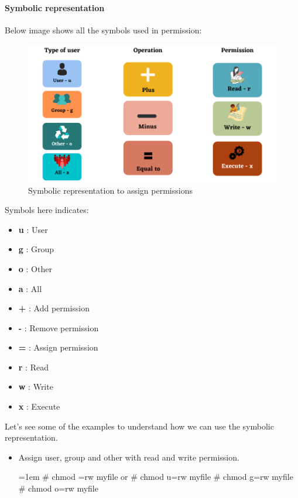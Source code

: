 \begin{flushleft}
	\paragraph{Symbolic representation}
	\bigskip
	Below image shows all the symbols used in permission:
	\begin{figure}[h!]
		\centering
		\includegraphics[scale=0.6]{content/chapter5/images/perm8.png}
		\bigskip
		\caption{Symbolic representation to assign permissions}
		\label{fig:assign_permission}
	\end{figure}
	
	Symbols here indicates:
	\begin{itemize}
		\item \textbf{u} : User
		\item \textbf{g} : Group
		\item \textbf{o} : Other
		\item \textbf{a} : All
		\item \textbf{+} : Add permission
		\item \textbf{-} : Remove permission
		\item \textbf{=} : Assign permission
		\item \textbf{r} : Read
		\item \textbf{w} : Write
		\item \textbf{x} : Execute
	\end{itemize}


	
	

	\newpage
	Let's see some of the examples to understand how we can use the symbolic representation.
	\begin{itemize}
	\item Assign user, group and other with read and write permission.
	\begin{tcolorbox}[breakable,notitle,boxrule=-0pt,colback=black,colframe=black]
		\color{green}
		\font=1em
		\# chmod =rw myfile
		\newline
		or
		\newline
		\# chmod u=rw myfile
		\newline
		\# chmod g=rw myfile
		\newline
		\# chmod o=rw myfile
		\font=4pt
	\end{tcolorbox}
	\bigskip
		

\end{itemize}
\end{flushleft}
